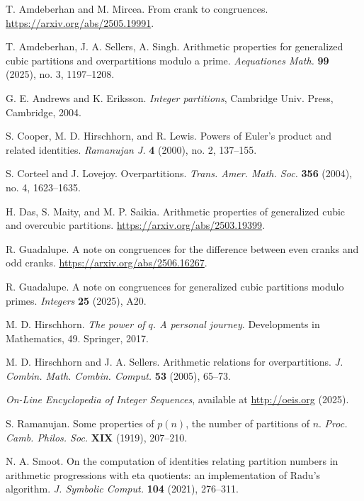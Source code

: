 \documentclass[10pt, reqno]{amsart}
\theoremstyle{theorem}
\theoremstyle{definition}
\theoremstyle{example}
\begin{document}
\begin{thebibliography}{99}

T. Amdeberhan and M. Mircea. From crank to congruences.  \url{https://arxiv.org/abs/2505.19991}.

T. Amdeberhan, J. A. Sellers, A. Singh.  Arithmetic properties for generalized cubic partitions and overpartitions modulo a prime.  \emph{Aequationes Math.} {\bf 99} (2025), no. 3, 1197--1208.

G. E. Andrews and K. Eriksson. \emph{Integer partitions}, Cambridge Univ. Press, Cambridge, 2004.

S. Cooper, M. D. Hirschhorn, and R. Lewis.  Powers of Euler's product and related identities. \emph{Ramanujan J.}  {\bf 4} (2000), no. 2, 137--155.

S. Corteel and J. Lovejoy. Overpartitions. \emph{Trans. Amer. Math. Soc.} {\bf 356} (2004), no. 4, 1623--1635.

H. Das, S. Maity, and M. P. Saikia.  Arithmetic properties of generalized cubic and overcubic partitions.  \url{https://arxiv.org/abs/2503.19399}.

R. Guadalupe.  A note on congruences for the difference between even cranks and odd cranks.  \url{https://arxiv.org/abs/2506.16267}.

R. Guadalupe.  A note on congruences for generalized cubic partitions modulo primes.  \emph{Integers} {\bf 25} (2025), A20.  

M. D. Hirschhorn.  \emph{The power of $q$.  A personal journey}.  Developments in Mathematics, 49. Springer, 2017.

M. D. Hirschhorn and J. A. Sellers.  Arithmetic relations for overpartitions. \emph{J. Combin. Math. Combin. Comput.} {\bf 53} (2005), 65--73.

\textit{On-Line Encyclopedia of Integer Sequences}, available at \url{http://oeis.org} (2025).

S. Ramanujan.  Some properties of $p(n)$, the number of partitions of $n$.  \emph{Proc. Camb. Philos. Soc.} {\bf XIX} (1919), 207--210.

N. A. Smoot.  On the computation of identities relating partition numbers in arithmetic progressions with eta quotients: an implementation of Radu's algorithm. \emph{J. Symbolic Comput.} {\bf 104} (2021), 276--311.

\end{thebibliography}
\end{document}
